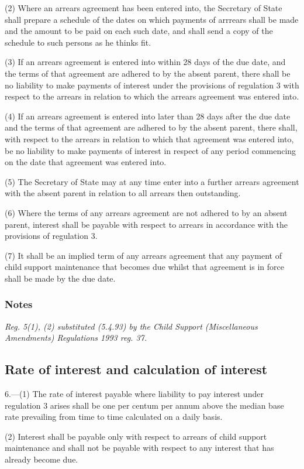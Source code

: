 \documentclass[a4paper]{article}
\newcommand\amendment[1]{\subsubsection*{Notes}{\itshape\frenchspacing\footnotesize #1 \par}}
\begin{document}
(2) Where an arrears agreement has been entered into, the Secretary of State shall prepare a schedule of the dates on which payments of arrrears shall be made and the amount to be paid on each such date, and shall send a copy of the schedule to such persons as he thinks fit.

(3) If an arrears agreement is entered into within 28 days of the due date, and the terms of that agreement are adhered to by the absent parent, there shall be no liability to make payments of interest under the provisions of regulation 3 with respect to the arrears in relation to which the arrears agreement was entered into.

(4) If an arrears agreement is entered into later than 28 days after the due date and the terms of that agreement are adhered to by the absent parent, there shall, with respect to the arrears in relation to which that agreement was entered into, be no liability to make payments of interest in respect of any period commencing on the date that agreement was entered into.

(5) The Secretary of State may at any time enter into a further arrears agreement with the absent parent in relation to all arrears then outstanding.

(6) Where the terms of any arrears agreement are not adhered to by an absent parent, interest shall be payable with respect to arrears in accordance with the provisions of regulation 3.

(7) It shall be an implied term of any arrears agreement that any payment of child support maintenance that becomes due whilst that agreement is in force shall be made by the due date.

\amendment{
Reg. 5(1), (2) substituted (5.4.93) by the Child Support (Miscellaneous Amendments) Regulations 1993 reg. 37.
}

\subsection[6. Rate of interest and calculation of interest]{Rate of interest and calculation of interest}

6.—(1) The rate of interest payable where liability to pay interest under regulation 3 arises shall be one per centum per annum above the median base rate prevailing from time to time calculated on a daily basis.

(2) Interest shall be payable only with respect to arrears of child support maintenance and shall not be payable with respect to any interest that has already become due.
\end{document}
